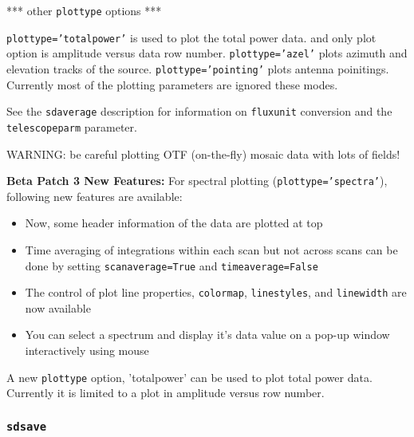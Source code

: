     *** other {\tt plottype} options ***

    {\tt plottype='totalpower'} is used to plot the total power data.
    and only plot option is amplitude versus data row number.
    {\tt plottype='azel'} plots azimuth and elevation tracks of the source.
    {\tt plottype='pointing'} plots antenna poinitings.
    Currently most of the plotting parameters are ignored these modes.

    See the {\tt sdaverage} description for information on {\tt fluxunit} 
    conversion and the {\tt telescopeparm} parameter.

    WARNING: be careful plotting OTF (on-the-fly) mosaic data with 
    lots of fields!

    {\bf Beta Patch 3 New Features:}
    For spectral plotting ({\tt plottype='spectra'}), following new 
    features are available: 
    \begin{itemize}
    \item Now, some header information of the data are plotted at top
    \item Time averaging of integrations within each scan but not across scans 
    can be done by setting {\tt scanaverage=True} and {\tt timeaverage=False}  
    \item The control of plot line properties, {\tt colormap},
    {\tt linestyles}, and {\tt linewidth} are now available
    \item You can select a spectrum and display it's data value on a
    pop-up window interactively using mouse
    \end{itemize}

    A new {\tt plottype} option, 'totalpower' can be used to plot total 
    power data. Currently it is limited to a plot in amplitude versus
    row number. 
\subsubsection{{\tt sdsave}}
\label{section:sd.sdtasks.tasks.sdsave}

